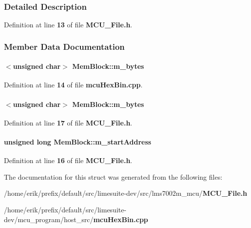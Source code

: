 \subsubsection{Detailed Description}


Definition at line {\bf 13} of file {\bf M\+C\+U\+\_\+\+File.\+h}.



\subsubsection{Member Data Documentation}
\paragraph[{m\+\_\+bytes}]{$<$unsigned char$>$ Mem\+Block\+::m\+\_\+bytes}\label{classMemBlock_a3d25101ce3c59d4e347a39a33ac03f23}


Definition at line {\bf 14} of file {\bf mcu\+Hex\+Bin.\+cpp}.

\paragraph[{m\+\_\+bytes}]{$<$unsigned char$>$ Mem\+Block\+::m\+\_\+bytes}\label{classMemBlock_a84f846b275176934dfde070dab82473f}


Definition at line {\bf 17} of file {\bf M\+C\+U\+\_\+\+File.\+h}.

\paragraph[{m\+\_\+start\+Address}]{\setlength{\rightskip}{0pt plus 5cm}unsigned long Mem\+Block\+::m\+\_\+start\+Address}\label{classMemBlock_a4642f25f334b651c11887512a1de11a1}


Definition at line {\bf 16} of file {\bf M\+C\+U\+\_\+\+File.\+h}.



The documentation for this struct was generated from the following files\+:\begin{DoxyCompactItemize}
\item 
/home/erik/prefix/default/src/limesuite-\/dev/src/lms7002m\+\_\+mcu/{\bf M\+C\+U\+\_\+\+File.\+h}\item 
/home/erik/prefix/default/src/limesuite-\/dev/mcu\+\_\+program/host\+\_\+src/{\bf mcu\+Hex\+Bin.\+cpp}\end{DoxyCompactItemize}
